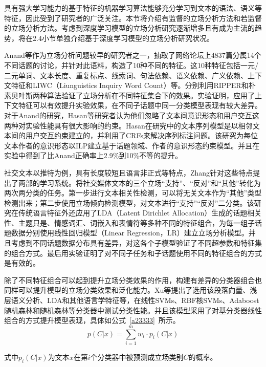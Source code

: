 具有强大学习能力的基于特征的机器学习算法能够充分学习到文本的语法、语义等特征，因此受到了研究者的广泛关注。本节将介绍有监督的立场分析方法和若监督的立场分析方法。考虑到深度学习模型的立场分析研究逐渐增多且有成为主流的趋势，将在2.4小节单独介绍基于深度学习模型的立场分析研究状况。



Anand等作为立场分析问题较早的研究者之一，抽取了网络论坛上4837篇分属14个不同话题的讨论，并针对此语料，构造了10种不同的特征。这10种特征包括一元/二元单词、文本长度、重复标点、线索词、句法依赖、语义依赖、广义依赖、上下文特征和LIWC（Liunguistics Inquiry Word Count）等。分别利用RIPPER和朴素贝叶斯两种算法验证了立场分析在不同特征集合下的效果。实验证明，应用了上下文特征可以有效提升实验效果，在不同子话题中同一分类模型表现有较大差异。对于Anand的研究，Hasan等研究者认为他们忽略了文本间意识形态和用户交互这两种对实验性能具有很大影响的约束。Hasan在研究中的文本序列模型是以相邻文本间的用户交互约束建立的，并利用了CRFs来解决序列标注问题。该研究为每位文本作者的意识形态以ILP建立基于话题领域、作者的意识形态约束模型。并且在实验中得到了比Anand正确率上2.9\%到10\%不等的提升。

社交文本以推特为例，具有长度较短且语言非正式等特点，Zhang针对这些特点提出了两部的学习系统。将社交媒体文本的三个立场“支持”、“反对”和“其他”转化为两次两分类的任务。第一步进行文本相关性检测，可以将无关文本作为“其他”类型检测出来；第二步使用立场倾向检测模型，对文本进行“支持”“反对”二分类。该研究在传统语言特征外还应用了LDA（Latent Dirichlet Allocation）生成的话题相关性、主题只是、情感词汇、词嵌入和表情符等多种不同的特征组合，为每一组子话题数据分别使用线性回归模型（Linear Regression，LR）建立立场分析模型。并且考虑到不同话题数据分布具有差异，对这各个子模型验证了不同超参数和特征集的组合方式。最后用实验证明了对不同子任务和子话题使用不同的特征组合的方式是有效的。

除了不同特征组合可以起到提升立场分类效果的作用，构建有差异的分类器组合也同样可以提升模型的立场分类效果和泛化能力。Xu等提出了选用该段落向量、浅层语义分析、LDA和其他语言学特征等，在线性SVMs、RBF核SVMs、Adaboost随机森林和随机森林等分类器中测试分类性能。并且该模型采用了对基分类器线性组合的方式提升模型表现，具体如公式~\ref{a23333}~所示。
\begin{equation}\label{a23333}
p(C|x)=\sum_{i=1}^m w_i \cdot p_i(C|x)
\end{equation}

式中$p_i(C|x)$为文本$x$在第$i$个分类器中被预测成立场类别$C$的概率。

